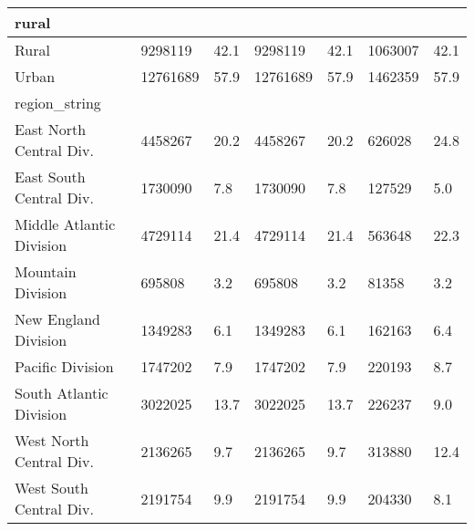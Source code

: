 \begin{tabular}{lll|ll|ll}
\multicolumn{1}{l}{rural} \\ 
\midrule
Rural & 9298119 & 42.1 & 9298119 & 42.1 & 1063007 & 42.1 \\ 
Urban & 12761689 & 57.9 & 12761689 & 57.9 & 1462359 & 57.9 \\ 
\midrule
\multicolumn{1}{l}{region\_string} \\ 
\midrule
East North Central Div. & 4458267 & 20.2 & 4458267 & 20.2 & 626028 & 24.8 \\ 
East South Central Div. & 1730090 & 7.8 & 1730090 & 7.8 & 127529 & 5.0 \\ 
Middle Atlantic Division & 4729114 & 21.4 & 4729114 & 21.4 & 563648 & 22.3 \\ 
Mountain Division & 695808 & 3.2 & 695808 & 3.2 & 81358 & 3.2 \\ 
New England Division & 1349283 & 6.1 & 1349283 & 6.1 & 162163 & 6.4 \\ 
Pacific Division & 1747202 & 7.9 & 1747202 & 7.9 & 220193 & 8.7 \\ 
South Atlantic Division & 3022025 & 13.7 & 3022025 & 13.7 & 226237 & 9.0 \\ 
West North Central Div. & 2136265 & 9.7 & 2136265 & 9.7 & 313880 & 12.4 \\ 
West South Central Div. & 2191754 & 9.9 & 2191754 & 9.9 & 204330 & 8.1 \\ 
\bottomrule
\end{tabular}

